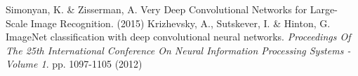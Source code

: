 \documentclass{article}
\begin{document}
\newpage



\begin{thebibliography}{1.7} 
	Simonyan, K. \& Zisserman, A. Very Deep Convolutional Networks for Large-Scale Image Recognition.  (2015)
	Krizhevsky, A., Sutskever, I. \& Hinton, G. ImageNet classification with deep convolutional neural networks. {\em Proceedings Of The 25th International Conference On Neural Information Processing Systems - Volume 1}. pp. 1097-1105 (2012)


\end{thebibliography}
\end{document}
